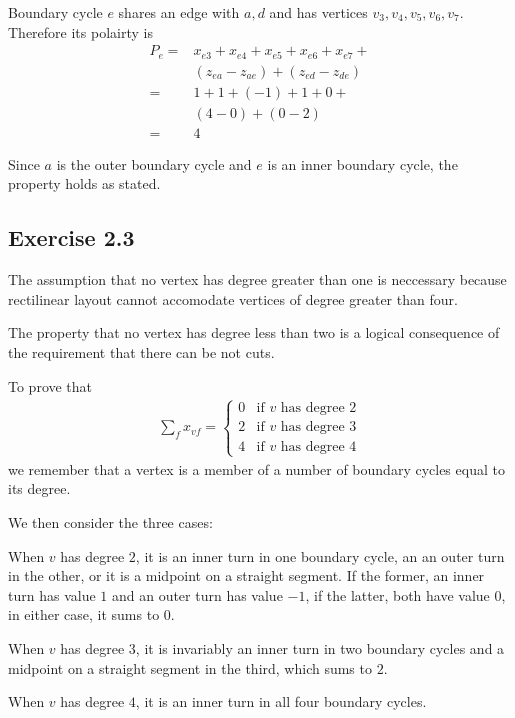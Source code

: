 Boundary cycle $e$ shares an edge with $a, d$ and has vertices $v_3, v_4, v_5, v_6, v_7$. Therefore
its polairty is
\begin{align*}
  P_e = &x_{e3} + x_{e4} + x_{e5} + x_{e6} + x_{e7} + \\
        &(z_{ea} - z_{ae}) + (z_{ed} - z_{de}) \\
      = & 1 + 1 + (-1) + 1 + 0 + \\
        & (4 - 0) + (0 - 2) \\
      = & 4
\end{align*}

Since $a$ is the outer boundary cycle and $e$ is an inner boundary cycle, the property holds as stated.

\subsection{Exercise 2.3}

The assumption that no vertex has degree greater than one is neccessary because
rectilinear layout cannot accomodate vertices of degree greater than four.

The property that no vertex has degree less than two is a logical consequence of
the requirement that there can be not cuts.

To prove that
\begin{align*}
  \sum_f x_{vf} = \begin{cases}
    0 & \text{if $v$ has degree $2$} \\
    2 & \text{if $v$ has degree $3$} \\
    4 & \text{if $v$ has degree $4$}
  \end{cases}
\end{align*}
we remember that a vertex is a member of a number of boundary cycles equal to
its degree.

We then consider the three cases:

When $v$ has degree $2$, it is
an inner turn in one boundary cycle, an an outer turn in the other, or it is
a midpoint on a straight segment. If the former, an inner turn has value $1$
and an outer turn has value $-1$, if the latter, both have value $0$, in either
case, it sums to $0$.

When $v$ has degree $3$, it is invariably an inner turn in two boundary cycles
and a midpoint on a straight segment in the third, which sums to $2$.

When $v$ has degree $4$, it is an inner turn in all four boundary cycles.

